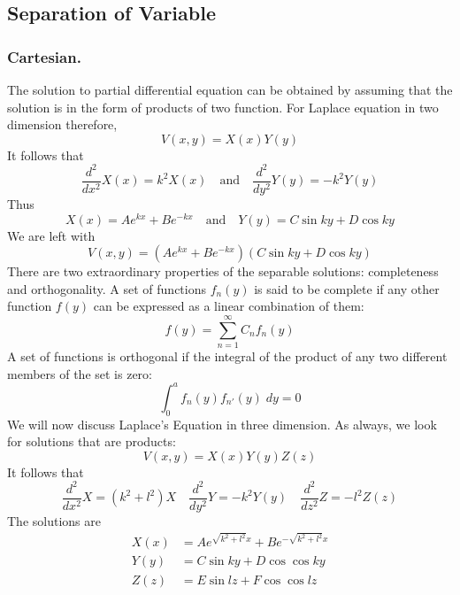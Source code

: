 \documentclass[../../../main.tex]{subfiles}
\begin{document}
\subsection{Separation of Variable}
\subsubsection{Cartesian.} 
The solution to partial differential equation can be obtained by assuming that the solution is in the form of products of two function. For Laplace equation in two dimension therefore,
\begin{equation*}
    V (x, y) = X (x)Y (y)
\end{equation*}
It follows that
\begin{equation*}
    \frac{d^2}{dx^2}X(x)=k^2X(x)\quad\text{and}\quad \frac{d^2}{dy^2}Y(y)=-k^2Y(y)
\end{equation*}
Thus
\begin{equation*}
    X(x)=Ae^{kx}+Be^{-kx} \quad\text{and}\quad Y(y)=C\sin ky+D \cos ky
\end{equation*}
We are left with
\begin{equation*}
    V (x, y) = (Ae^{kx}+Be^{-kx})(C\sin ky+D \cos ky)
\end{equation*}
There are two extraordinary properties of the separable solutions: completeness and orthogonality. A set of functions $f_n (y)$ is said to be complete if any other function $f (y)$ can be expressed as a linear combination of them:
\begin{equation*}
    f(y)=\sum_{n=1}^{\infty}C_nf_n (y)
\end{equation*}
A set of functions is orthogonal if the integral of the product of any two different members of the set is zero:
\begin{equation*}
    \int_{0}^{a}f_n (y)f_{n'} (y)\;dy=0
\end{equation*}
We will now discuss Laplace's Equation in three dimension. As always, we look for solutions that are products:
\begin{equation*}
    V (x, y) = X (x)Y (y)Z(z)
\end{equation*}
It follows that
\begin{equation*}
    \frac{d^2}{dx^2}X=(k^2+l^2)X \quad \frac{d^2}{dy^2}Y=-k^2Y(y) \quad \frac{d^2}{dz^2}Z=-l^2Z(z)
\end{equation*}
The solutions are
\begin{align*}
    X(x)&=Ae^{\sqrt{k^2+l^2}x}+Be^{-\sqrt{k^2+l^2}x}\\
    Y(y)&=C\sin ky+D\cos \cos ky\\
Z(z)&=E\sin lz+F\cos \cos lz
\end{align*}
\end{document}
